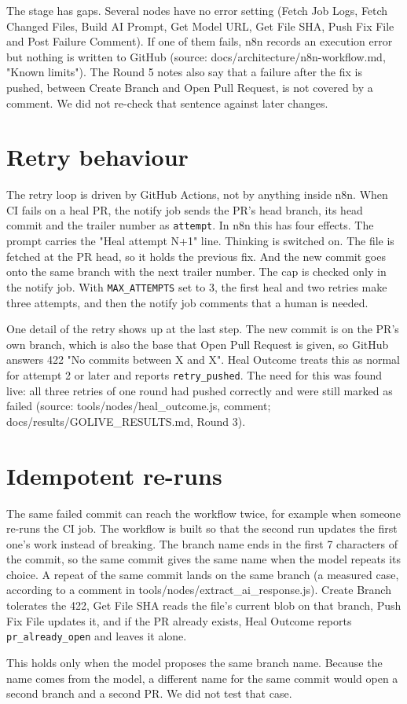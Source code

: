 The stage has gaps. Several nodes have no error setting (Fetch Job Logs, Fetch Changed Files, Build AI Prompt, Get Model URL, Get File SHA, Push Fix File and Post Failure Comment). If one of them fails, n8n records an execution error but nothing is written to GitHub (source: docs/\allowbreak{}architecture/\allowbreak{}n8n-workflow.md, "Known limits"). The Round 5 notes also say that a failure after the fix is pushed, between Create Branch and Open Pull Request, is not covered by a comment. We did not re-check that sentence against later changes.

\section{Retry behaviour}



The retry loop is driven by GitHub Actions, not by anything inside n8n. When CI fails on a heal PR, the notify job sends the PR's head branch, its head commit and the trailer number as \texttt{attempt}. In n8n this has four effects. The prompt carries the "Heal attempt N+1" line. Thinking is switched on. The file is fetched at the PR head, so it holds the previous fix. And the new commit goes onto the same branch with the next trailer number. The cap is checked only in the notify job. With \texttt{MAX\_\allowbreak{}ATTEMPTS} set to 3, the first heal and two retries make three attempts, and then the notify job comments that a human is needed.

One detail of the retry shows up at the last step. The new commit is on the PR's own branch, which is also the base that Open Pull Request is given, so GitHub answers 422 "No commits between X and X". Heal Outcome treats this as normal for attempt 2 or later and reports \texttt{retry\_\allowbreak{}pushed}. The need for this was found live: all three retries of one round had pushed correctly and were still marked as failed (source: tools/\allowbreak{}nodes/\allowbreak{}heal\_\allowbreak{}outcome.js, comment; docs/\allowbreak{}results/\allowbreak{}GOLIVE\_\allowbreak{}RESULTS.md, Round 3).

\section{Idempotent re-runs}

The same failed commit can reach the workflow twice, for example when someone re-runs the CI job. The workflow is built so that the second run updates the first one's work instead of breaking. The branch name ends in the first 7 characters of the commit, so the same commit gives the same name when the model repeats its choice. A repeat of the same commit lands on the same branch (a measured case, according to a comment in tools/\allowbreak{}nodes/\allowbreak{}extract\_\allowbreak{}ai\_\allowbreak{}response.js). Create Branch tolerates the 422, Get File SHA reads the file's current blob on that branch, Push Fix File updates it, and if the PR already exists, Heal Outcome reports \texttt{pr\_\allowbreak{}already\_\allowbreak{}open} and leaves it alone.

This holds only when the model proposes the same branch name. Because the name comes from the model, a different name for the same commit would open a second branch and a second PR. We did not test that case.
